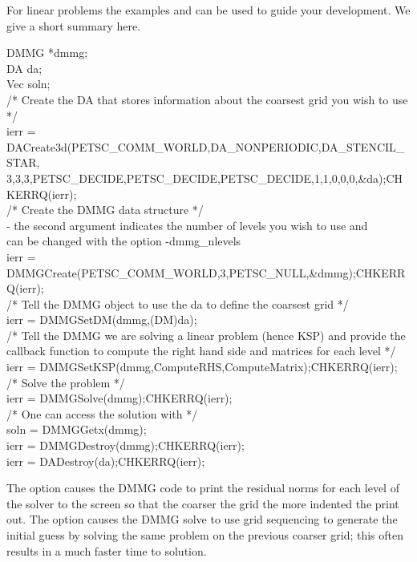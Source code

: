 For linear problems the examples  and  can be used
to guide your development. We give a short summary here.
\begin{tabbing}
  DMMG        *dmmg;\\
  DA          da;\\
  Vec         soln;\\

  /* Create the DA that stores information about the coarsest grid you wish to use */\\
  ierr = DACreate3d(PETSC\_COMM\_WORLD,DA\_NONPERIODIC,DA\_STENCIL\_STAR,\\
         3,3,3,PETSC\_DECIDE,PETSC\_DECIDE,PETSC\_DECIDE,1,1,0,0,0,\&da);CHKERRQ(ierr);\\

  /* Create the DMMG data structure */\\
       - the second argument indicates the number of levels you wish to use and \\
         can be changed with the option -dmmg\_nlevels \\
  ierr = DMMGCreate(PETSC\_COMM\_WORLD,3,PETSC\_NULL,\&dmmg);CHKERRQ(ierr);\\

  /*  Tell the DMMG object to use the da to define the coarsest grid */\\
  ierr = DMMGSetDM(dmmg,(DM)da);\\

  /*  Tell the DMMG we are solving a linear problem (hence KSP) and provide the \\
      callback function to compute the right hand side and matrices for each level */\\
  ierr = DMMGSetKSP(dmmg,ComputeRHS,ComputeMatrix);CHKERRQ(ierr);\\

  /*  Solve the problem */\\
  ierr = DMMGSolve(dmmg);CHKERRQ(ierr);\\

  /*  One can access the solution with */\\
  soln = DMMGGetx(dmmg);\\

  ierr = DMMGDestroy(dmmg);CHKERRQ(ierr);\\
  ierr = DADestroy(da);CHKERRQ(ierr);\\
\end{tabbing}
     
The option   
 causes the DMMG code to print the residual norms for each level of the solver to the screen so that
the coarser the grid the more indented the print out. The option   causes the 
DMMG solve to use grid sequencing to generate the initial guess by solving the same problem on the previous coarser grid; this often
results in a much faster time to solution.

